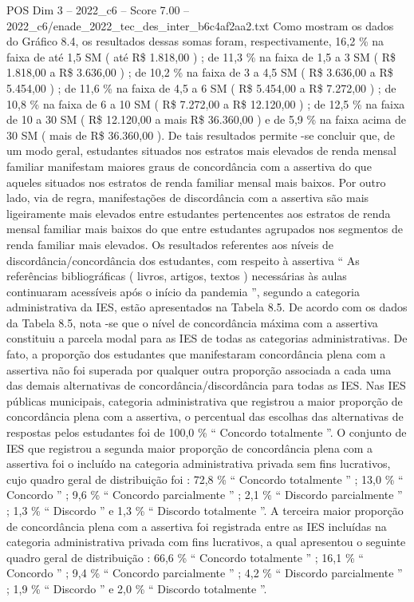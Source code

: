 \begin{textsample}{POS Dim 3 – 2022\_c6 – Score 7.00 – 2022\_c6/enade\_2022\_tec\_des\_inter\_b6c4af2aa2.txt}
Como mostram os dados do Gráfico 8.4, os resultados dessas somas foram, respectivamente, 16,2 \% na faixa de até 1,5 SM ( até R\$ 1.818,00 ) ; de 11,3 \% na faixa de 1,5 a 3 SM ( R\$ 1.818,00 a R\$ 3.636,00 ) ; de 10,2 \% na faixa de 3 a 4,5 SM ( R\$ 3.636,00 a R\$ 5.454,00 ) ; de 11,6 \% na faixa de 4,5 a 6 SM ( R\$ 5.454,00 a R\$ 7.272,00 ) ; de 10,8 \% na faixa de 6 a 10 SM ( R\$ 7.272,00 a R\$ 12.120,00 ) ; de 12,5 \% na faixa de 10 a 30 SM ( R\$ 12.120,00 a mais R\$ 36.360,00 ) e de 5,9 \% na faixa acima de 30 SM ( mais de R\$ 36.360,00 ).
De tais resultados permite -se concluir que, de um modo geral, estudantes situados nos estratos mais elevados de renda mensal familiar manifestam maiores graus de concordância com a assertiva do que aqueles situados nos estratos de renda familiar mensal mais baixos.
Por outro lado, via de regra, manifestações de discordância com a assertiva são mais ligeiramente mais elevados entre estudantes pertencentes aos estratos de renda mensal familiar mais baixos do que entre estudantes agrupados nos segmentos de renda familiar mais elevados.
Os resultados referentes aos níveis de discordância/concordância dos estudantes, com respeito à assertiva “ As referências bibliográficas ( livros, artigos, textos ) necessárias às aulas continuaram acessíveis após o início da pandemia ”, segundo a categoria administrativa da IES, estão apresentados na Tabela 8.5.
De acordo com os dados da Tabela 8.5, nota -se que o nível de concordância máxima com a assertiva constituiu a parcela modal para as IES de todas as categorias administrativas.
De fato, a proporção dos estudantes que manifestaram concordância plena com a assertiva não foi superada por qualquer outra proporção associada a cada uma das demais alternativas de concordância/discordância para todas as IES.
Nas IES públicas municipais, categoria administrativa que registrou a maior proporção de concordância plena com a assertiva, o percentual das escolhas das alternativas de respostas pelos estudantes foi de 100,0 \% “ Concordo totalmente ”.
O conjunto de IES que registrou a segunda maior proporção de concordância plena com a assertiva foi o incluído na categoria administrativa privada sem fins lucrativos, cujo quadro geral de distribuição foi : 72,8 \% “ Concordo totalmente ” ; 13,0 \% “ Concordo ” ; 9,6 \% “ Concordo parcialmente ” ; 2,1 \% “ Discordo parcialmente ” ; 1,3 \% “ Discordo ” e 1,3 \% “ Discordo totalmente ”.
A terceira maior proporção de concordância plena com a assertiva foi registrada entre as IES incluídas na categoria administrativa privada com fins lucrativos, a qual apresentou o seguinte quadro geral de distribuição : 66,6 \% “ Concordo totalmente ” ; 16,1 \% “ Concordo ” ; 9,4 \% “ Concordo parcialmente ” ; 4,2 \% “ Discordo parcialmente ” ; 1,9 \% “ Discordo ” e 2,0 \% “ Discordo totalmente ”.

\end{textsample}
